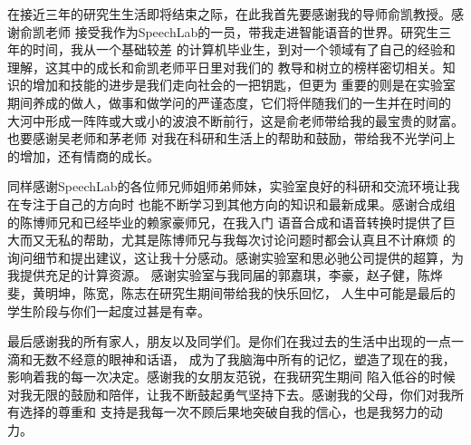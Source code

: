 

\begin{acknowledgements}
  在接近三年的研究生生活即将结束之际，在此我首先要感谢我的导师俞凯教授。感谢俞凯老师
  接受我作为SpeechLab的一员，带我走进智能语音的世界。研究生三年的时间，我从一个基础较差
  的计算机毕业生，到对一个领域有了自己的经验和理解，这其中的成长和俞凯老师平日里对我们的
  教导和树立的榜样密切相关。知识的增加和技能的进步是我们走向社会的一把钥匙，但更为
  重要的则是在实验室期间养成的做人，做事和做学问的严谨态度，它们将伴随我们的一生并在时间的
  大河中形成一阵阵或大或小的波浪不断前行，这是俞老师带给我的最宝贵的财富。也要感谢吴老师和茅老师
  对我在科研和生活上的帮助和鼓励，带给我不光学问上的增加，还有情商的成长。

  同样感谢SpeechLab的各位师兄师姐师弟师妹，实验室良好的科研和交流环境让我在专注于自己的方向时
  也能不断学习到其他方向的知识和最新成果。感谢合成组的陈博师兄和已经毕业的赖家豪师兄，在我入门
  语音合成和语音转换时提供了巨大而又无私的帮助，尤其是陈博师兄与我每次讨论问题时都会认真且不计麻烦
  的询问细节和提出建议，这让我十分感动。感谢实验室和思必驰公司提供的超算，为我提供充足的计算资源。
  感谢实验室与我同届的郭嘉琪，李豪，赵子健，陈烨斐，黄明坤，陈宽，陈志在研究生期间带给我的快乐回忆，
  人生中可能是最后的学生阶段与你们一起度过甚是有幸。

  最后感谢我的所有家人，朋友以及同学们。是你们在我过去的生活中出现的一点一滴和无数不经意的眼神和话语，
  成为了我脑海中所有的记忆，塑造了现在的我，影响着我的每一次决定。感谢我的女朋友范锐，在我研究生期间
  陷入低谷的时候对我无限的鼓励和陪伴，让我不断鼓起勇气坚持下去。感谢我的父母，你们对我所有选择的尊重和
  支持是我每一次不顾后果地突破自我的信心，也是我努力的动力。



\end{acknowledgements}

